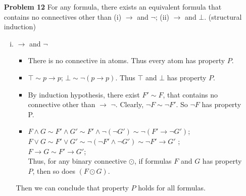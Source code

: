 \begin{enumerate}
\begin{enumerate} [(i)]
          \item $\vee$ and $\neg$ 
            \begin{itemize}
                \item There is no connective in atoms. Thus every atom has property $P$. 
                \item $\top \sim p \vee \neg p$; $\bot \sim \neg (p \vee \neg p) $. Thus $\top$ and $\bot$ has property $P$. 
                \item By induction hypothesis, there exist $F' \sim F$, that contains no connective other than $\wedge$  $\neg$.  Clearly, $\neg F \sim \neg F'$.  So $\neg F$ has property P. 
                \item $F \wedge G \sim F' \wedge G' \sim \neg (\neg F' \vee \neg G') $; (\textit{De Morgan's Law}) \\
                 $F \vee G \sim F' \vee G'$;  \\
                 $ F \rightarrow G \sim F' \rightarrow G' \sim \neg (F' \wedge \neg G') \sim \neg F' \vee G'$ \\
                 Thus, for any binary connective $\odot$, if formulas $F$ and $G$ has property $P$, then so does $(F \odot G)$. 
            \end{itemize}
       Then we can conclude that property $P$ holds for all formulas.    
    \end{enumerate}
    
\item[\textbf{Problem 12}] For any formula, there exists an equivalent formula that contains no connectives other than (i) $\rightarrow $ and $\neg$; (ii) $\rightarrow $ and $\bot$.  (structural induction)
    \begin{enumerate} [(i)]
        \item $\rightarrow $ and $\neg$ 
            \begin{itemize}
                \item There is no connective in atoms. Thus every atom has property $P$. 
                \item $\top \sim p \rightarrow p$; $\bot \sim \neg(p \rightarrow p)$. Thus $\top$ and $\bot$ has property $P$. 
                \item By induction hypothesis, there exist $F' \sim F$, that contains no connective other than $\rightarrow $  $\neg$. Clearly, $\neg F \sim \neg F'$.  So $\neg F$ has property P. 
                \item $F \wedge G \sim F' \wedge G' \sim F' \wedge \neg (\neg G') \sim \neg ( F' \rightarrow \neg G') $; \\
                 $F \vee G \sim F' \vee G' \sim \neg (\neg F' \wedge \neg G') \sim \neg 
                 F' \rightarrow G' $ ;  \\
                 $F \rightarrow G \sim F' \rightarrow G'$;\\
                  Thus, for any binary connective $\odot$, if formulas $F$ and $G$ has property $P$, then so does $(F \odot G)$. 
            \end{itemize}
       Then we can conclude that property $P$ holds for all formulas.   
       

\end{enumerate}
\end{enumerate}

